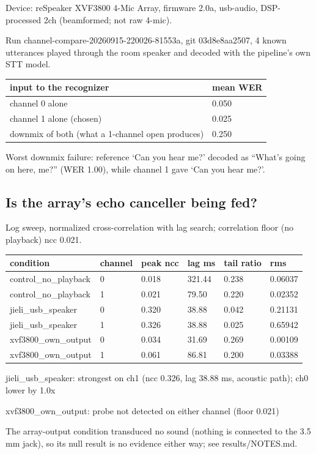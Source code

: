 Device: reSpeaker XVF3800 4-Mic Array, firmware 2.0a, usb-audio, DSP-processed 2ch (beamformed; not raw 4-mic).

Run channel-compare-20260915-220026-81553a, git 03d8e8aa2507, 4 known utterances played through the room speaker and decoded with the pipeline's own STT model.

\begin{center}\footnotesize
\begin{tabular}{ll}
\toprule
input to the recognizer & mean WER \\
\midrule
channel 0 alone & 0.050 \\
channel 1 alone (chosen) & 0.025 \\
downmix of both (what a 1-channel open produces) & 0.250 \\
\bottomrule
\end{tabular}
\end{center}
Worst downmix failure: reference `Can you hear me?' decoded as ``What's going on here, me?'' (WER 1.00), while channel 1 gave `Can you hear me?'.

\subsection*{Is the array's echo canceller being fed?}
Log sweep, normalized cross-correlation with lag search; correlation floor (no playback) ncc 0.021.

\begin{center}\footnotesize
\begin{tabular}{llllll}
\toprule
condition & channel & peak ncc & lag ms & tail ratio & rms \\
\midrule
control\_no\_playback & 0 & 0.018 & 321.44 & 0.238 & 0.06037 \\
control\_no\_playback & 1 & 0.021 & 79.50 & 0.220 & 0.02352 \\
jieli\_usb\_speaker & 0 & 0.320 & 38.88 & 0.042 & 0.21131 \\
jieli\_usb\_speaker & 1 & 0.326 & 38.88 & 0.025 & 0.65942 \\
xvf3800\_own\_output & 0 & 0.034 & 31.69 & 0.269 & 0.00109 \\
xvf3800\_own\_output & 1 & 0.061 & 86.81 & 0.200 & 0.03388 \\
\bottomrule
\end{tabular}
\end{center}
jieli\_usb\_speaker: strongest on ch1 (ncc 0.326, lag 38.88 ms, acoustic path); ch0 lower by 1.0x

xvf3800\_own\_output: probe not detected on either channel (floor 0.021)

The array-output condition transduced no sound (nothing is connected to the 3.5 mm jack), so its null result is no evidence either way; see results/NOTES.md.


